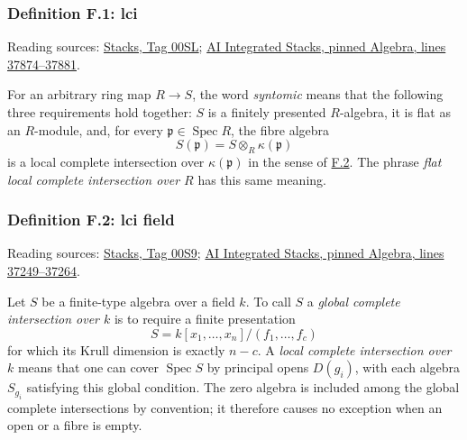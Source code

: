\documentclass[11pt,a4paper,openany]{report}
\begin{document}
\label{AG-RG-S05-algebra-definition-lci}

\subsubsection{Definition F.1: lci}\label{AG-RG-S05-definition-f.1-lci}

Reading sources: \href{https://stacks.math.columbia.edu/tag/00SL}{Stacks, Tag 00SL}; \href{https://github.com/KokunoYumeto/unofficial-stacks-project-ai-drafts/blob/565b10e987aba5969b21145a0833f42d69f96790/algebra.tex\#L37874-L37881}{AI Integrated Stacks, pinned Algebra, lines 37874--37881}.

For an arbitrary ring map \(R\to S\), the word \emph{syntomic} means that the following three requirements hold together: \(S\) is a finitely presented \(R\)-algebra, it is flat as an \(R\)-module, and, for every \(\mathfrak p\in\operatorname{Spec}R\), the fibre algebra \[S(\mathfrak p)=S\otimes_R\kappa(\mathfrak p)\] is a local complete intersection over \(\kappa(\mathfrak p)\) in the sense of \hyperref[AG-RG-S05-algebra-definition-lci-field]{F.2}. The phrase \emph{flat local complete intersection over \(R\)} has this same meaning.

\label{AG-RG-S05-algebra-definition-lci-field}

\subsubsection{Definition F.2: lci field}\label{AG-RG-S05-definition-f.2-lci-field}

Reading sources: \href{https://stacks.math.columbia.edu/tag/00S9}{Stacks, Tag 00S9}; \href{https://github.com/KokunoYumeto/unofficial-stacks-project-ai-drafts/blob/565b10e987aba5969b21145a0833f42d69f96790/algebra.tex\#L37249-L37264}{AI Integrated Stacks, pinned Algebra, lines 37249--37264}.

Let \(S\) be a finite-type algebra over a field \(k\). To call \(S\) a \emph{global complete intersection over \(k\)} is to require a finite presentation \[S=k[x_1,\ldots,x_n]/(f_1,\ldots,f_c)\] for which its Krull dimension is exactly \(n-c\). A \emph{local complete intersection over \(k\)} means that one can cover \(\operatorname{Spec}S\) by principal opens \(D(g_i)\), with each algebra \(S_{g_i}\) satisfying this global condition. The zero algebra is included among the global complete intersections by convention; it therefore causes no exception when an open or a fibre is empty.
\end{document}
